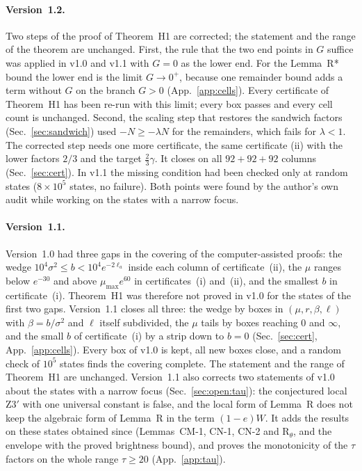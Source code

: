 \paragraph*{Version~1.2.}
Two steps of the proof of Theorem~H1 are corrected; the statement and the range of the theorem are unchanged.
First, the rule that the two end points in $G$ suffice was applied in v1.0 and v1.1 with $G=0$ as the lower end.
For the Lemma~R* bound the lower end is the limit $G\to0^+$, because one remainder bound adds a term without $G$ on the branch $G>0$ (App.~\ref{app:cells}).
Every certificate of Theorem~H1 has been re-run with this limit; every box passes and every cell count is unchanged.
Second, the scaling step that restores the sandwich factors (Sec.~\ref{sec:sandwich}) used $-N\ge-\lambda N$ for the remainders, which fails for $\lambda<1$.
The corrected step needs one more certificate, the same certificate (ii) with the lower factors $2/3$ and the target $\frac23\gamma$.
It closes on all $92+92+92$ columns (Sec.~\ref{sec:cert}).
In v1.1 the missing condition had been checked only at random states ($8\times10^5$ states, no failure).
Both points were found by the author's own audit while working on the states with a narrow focus.

\paragraph*{Version~1.1.}
Version~1.0 had three gaps in the covering of the computer-assisted proofs: the wedge $10^4\sigma^2\le b<10^4e^{-2\ell_a}$ inside each column of certificate~(ii), the $\mu$ ranges below $e^{-30}$ and above $\mu_{\max}e^{60}$ in certificates~(i) and~(ii), and the smallest $b$ in certificate~(i).
Theorem~H1 was therefore not proved in v1.0 for the states of the first two gaps.
Version~1.1 closes all three: the wedge by boxes in $(\mu,r,\beta,\ell)$ with $\beta=b/\sigma^2$ and $\ell$ itself subdivided, the $\mu$ tails by boxes reaching $0$ and $\infty$, and the small $b$ of certificate~(i) by a strip down to $b=0$ (Sec.~\ref{sec:cert}, App.~\ref{app:cells}).
Every box of v1.0 is kept, all new boxes close, and a random check of $10^5$ states finds the covering complete.
The statement and the range of Theorem~H1 are unchanged.
Version~1.1 also corrects two statements of v1.0 about the states with a narrow focus (Sec.~\ref{sec:open:tau}): the conjectured local Z3$'$ with one universal constant is false, and the local form of Lemma~R does not keep the algebraic form of Lemma~R in the term $(1-e)W$.
It adds the results on these states obtained since (Lemmas~CM-1, CN-1, CN-2 and R$_\theta$, and the envelope with the proved brightness bound), and proves the monotonicity of the $\tau$ factors on the whole range $\tau\ge20$ (App.~\ref{app:tau}).

